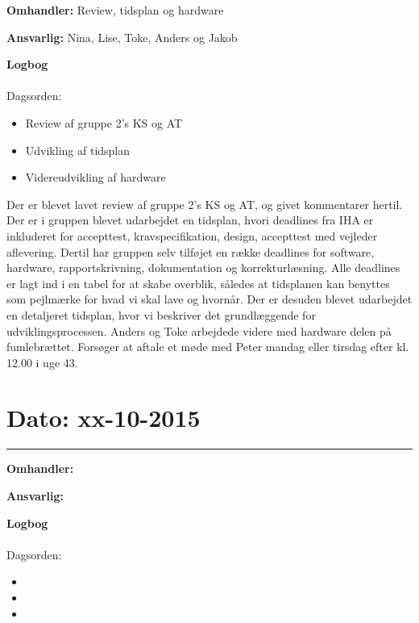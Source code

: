 \textbf{Omhandler:} Review, tidsplan og hardware  

\textbf{Ansvarlig:} Nina, Lise, Toke, Anders og Jakob

\textbf{Logbog}
\\
\\
Dagsorden:
\begin{itemize}
	\item Review af gruppe 2's KS og AT
	\item Udvikling af tidsplan
	\item Videreudvikling af hardware
\end{itemize}

Der er blevet lavet review af gruppe 2's KS og AT, og givet kommentarer hertil. 
Der er i gruppen blevet udarbejdet en tidsplan, hvori deadlines fra IHA er inkluderet for accepttest, kravspecifikation, design, accepttest med vejleder aflevering. Dertil har gruppen selv tilføjet en række deadlines for software, hardware, rapportskrivning, dokumentation og korrekturlæsning. Alle deadlines er lagt ind i en tabel for at skabe overblik, således at tidsplanen kan benyttes som pejlmærke for hvad vi skal lave og hvornår.
Der er desuden blevet udarbejdet en detaljeret tidsplan, hvor vi beskriver det grundlæggende for udviklingsprocessen.
Anders og Toke arbejdede videre med hardware delen på fumlebrættet.
Forsøger at aftale et møde med Peter mandag eller tirsdag efter kl. 12.00 i uge 43.


\section{Dato: xx-10-2015 }
\hrule

\textbf{Omhandler:}  

\textbf{Ansvarlig:} 

\textbf{Logbog}
\\
\\
Dagsorden:
\begin{itemize}
	\item 
	\item 
	\item 
\end{itemize}